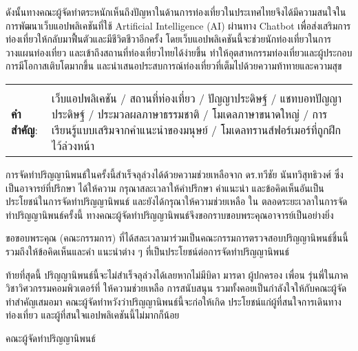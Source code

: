 \documentclass[12pt,oneside,openright,a4paper]{cpe-thai-project}
\begin{document}
ดังนั้นทางคณะผู้จัดทำตระหนักเห็นถึงปัญหาในด้านการท่องเที่ยวในประเทศไทยจึงได้มีความสนใจในการพัฒนาเว็บแอปพลิเคชันที่ใช้ Artificial Intelligence (AI) ผ่านทาง Chatbot เพื่อส่งเสริมการท่องเที่ยวให้กลับมาฟื้นตัวและมีชีวิตชีวาอีกครั้ง โดยเว็บแอปพลิเคชันนี้จะช่วยนักท่องเที่ยวในการวางแผนท่องเที่ยว และเข้าถึงสถานที่ท่องเที่ยวไทยได้ง่ายขึ้น ทำให้อุตสาหกรรมท่องเที่ยวและผู้ประกอบการมีโอกาสเติบโตมากขึ้น และนำเสนอประสบการณ์ท่องเที่ยวที่เต็มไปด้วยความท้าทายและความสุข

\begin{flushleft}
\begin{tabular*}{\textwidth}{@{}lp{}}
 & \\

\textbf{คำสำคัญ}: & เว็บแอปพลิเคชัน / สถานที่ท่องเที่ยว / ปัญญาประดิษฐ์ / แชทบอทปัญญาประดิษฐ์ / ประมวลผลภาษาธรรมชาติ  / โมเดลภาษาขนาดใหญ่ / การเรียนรู้แบบเสริมจากคำแนะนำของมนุษย์ / โมเดลทรานส์ฟอร์เมอร์ที่ถูกฝึกไว้ล่วงหน้า
\end{tabular*}
\end{flushleft}
\endabstract


\preface
การจัดทําปริญญานิพนธ์ในครั้งนี้สําเร็จลุล่วงได้ด้วยความช่วยเหลือจาก ดร.ทวีชัย นันทวิสุทธิวงศ์ ซึ่งเป็นอาจารย์ที่ปรึกษา ได้ให้ความ
กรุณาสละเวลาให้คําปรึกษา คําแนะนํา และข้อคิดเห็นอันเป็นประโยชน์ในการจัดทําปริญญานิพนธ์ และยังได้กรุณาให้ความช่วยเหลือ ใน
ตลอดระยะเวลาในการจัดทําปริญญานิพนธ์ครั้งนี้ ทางคณะผู้จัดทําปริญญานิพนธ์จึงขอกราบขอบพระคุณอาจารย์เป็นอย่างยิ่ง

ขอขอบพระคุณ (คณะกรรมการ) ที่ได้สละเวลามาร่วมเป็นคณะกรรมการตรวจสอบปริญญานิพนธ์ชิ้นนี้ รวมถึงให้ข้อคิดเห็นและคํา
แนะนําต่าง ๆ ที่เป็นประโยชน์ต่อการจัดทําปริญญานิพนธ์

ท้ายที่สุดนี้ ปริญญานิพนธ์นี้จะไม่สําเร็จลุล่วงได้เลยหากไม่มีบิดา มารดา ผู้ปกครอง เพื่อน รุ่นพี่ในภาควิชาวิศวกรรมคอมพิวเตอร์ที่
ให้ความช่วยเหลือ การสนับสนุน รวมทั้งคอยเป็นกําลังใจให้กับคณะผู้จัดทําสําคัญเสมอมา คณะผู้จัดทําหวังว่าปริญญานิพนธ์นี้จะก่อให้เกิด
ประโยชน์แก่ผู้ที่สนใจการเดินทางท่องเที่ยว และผู้ที่สนใจแอปพลิเคชันนี้ไม่มากก็น้อย \\

\begin{flushright}คณะผู้จัดทําปริญญานิพนธ์\end{flushright}

\tableofcontents                    
\listoftables
\listoffigures                      
\end{document}
